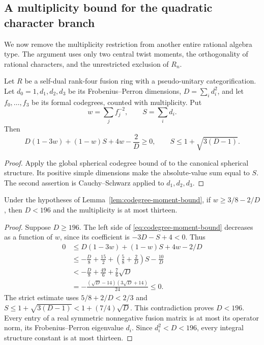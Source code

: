 \subsection{A multiplicity bound for the quadratic character branch}
\label{sec:quadratic-character-bound}
We now remove the multiplicity restriction from another entire rational
algebra type. The argument uses only two central twist moments, the
orthogonality of rational characters, and the unrestricted exclusion of
$R_n$.

\begin{lemma}\label{lem:codegree-moment-bound}
Let $R$ be a self-dual rank-four fusion ring with a pseudo-unitary
categorification. Let $d_0=1,d_1,d_2,d_3$ be its Frobenius--Perron
dimensions, $D=\sum_i d_i^2$, and let $f_0,\ldots,f_3$ be its formal
codegrees, counted with multiplicity. Put
\[
 w=\sum_j f_j^{-2},\qquad S=\sum_i d_i.
\]
Then
\begin{equation}\label{eq:codegree-moment-bound}
 D(1-3w)+(1-w)S+4w-\frac2D\geq0,
 \qquad S\leq1+\sqrt{3(D-1)}.
\end{equation}
\end{lemma}
\begin{proof}
Apply the global spherical codegree bound of
\cite[Proposition~\ref{B-prop:spherical-codegree-moment}]{Finite} to the
canonical spherical structure. Its positive simple dimensions make the
absolute-value sum equal to $S$. The second assertion is Cauchy--Schwarz
applied to $d_1,d_2,d_3$.
\end{proof}

\begin{corollary}\label{cor:dimension-196}
Under the hypotheses of Lemma~\ref{lem:codegree-moment-bound}, if
$w\geq3/8-2/D$, then $D<196$ and the multiplicity is at most thirteen.
\end{corollary}
\begin{proof}
Suppose $D\geq196$. The left side of
\eqref{eq:codegree-moment-bound} decreases as a function of $w$, since
its coefficient is $-3D-S+4<0$. Thus
\begin{align*}
 0&\leq D(1-3w)+(1-w)S+4w-2/D\\
  &\leq-\frac D8+\frac{15}2+
         \left(\frac58+\frac2D\right)S-\frac{10}D\\
  &<-\frac D8+\frac{49}6+\frac76\sqrt D\\
  &=-\frac{(\sqrt D-14)(3\sqrt D+14)}{24}\leq0.
\end{align*}
The strict estimate uses $5/8+2/D<2/3$ and
$S\leq1+\sqrt{3(D-1)}<1+(7/4)\sqrt D$.
This contradiction proves $D<196$.
Every entry of a real symmetric nonnegative fusion matrix is at most
its operator norm, its Frobenius--Perron eigenvalue $d_i$.
Since $d_i^2<D<196$, every integral structure constant is at most thirteen.
\end{proof}

